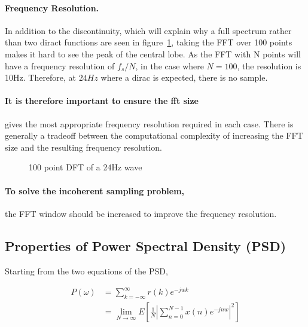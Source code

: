 \documentclass[main.tex]{subfiles}
\begin{document}
\paragraph{Frequency Resolution.} In addition to the discontinuity, which will explain why a full spectrum rather than two diract functions are seen in figure~\ref{fig:q1_1_c}, taking the FFT over 100 points makes it hard to see the peak of the central lobe. As the FFT with N points will have a frequency resolution of $f_s/N$, in the case where $N=100$, the resolution is 10Hz. Therefore, at $24Hz$ where a dirac is expected, there is no sample.

\paragraph{It is therefore important to ensure the fft size} gives the most appropriate frequency resolution required in each case. There is generally a tradeoff between the computational complexity of increasing the FFT size and the resulting frequency resolution.

\begin{figure}[H]
	\centering 
	\resizebox{0.7\textwidth}{!}{}
	\caption{100 point DFT of a 24Hz wave}
	\label{fig:q1_1_c}
\end{figure}


\paragraph{To solve the incoherent sampling problem,} the FFT window should be increased to improve the frequency resolution.




















\subsection{Properties of Power Spectral Density (PSD)}

Starting from the two equations of the PSD,

\begin{align}
P(\omega) &= \sum_{k=-\infty}^{\infty}r(k)e^{-jwk}\\
&= \lim_{N \rightarrow \infty} 
E \left[ 
		\frac{1}{N} \left| \sum_{n=0}^{N-1}x(n)e^{-jnw} \right| ^2
\right] \label{eq:1-0-psd-1}
\end{align}
\end{document}
